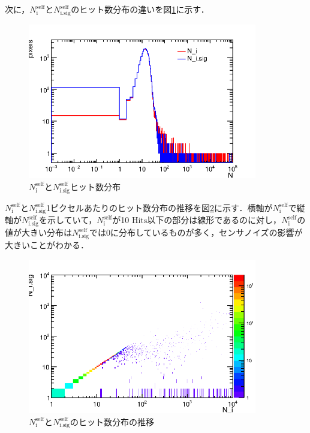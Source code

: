 次に，$N_{\mathrm{i}}^{\mathrm{self}}$と$N_{\mathrm{i.sig}}^{\mathrm{self}}$のヒット数分布の違いを図\ref{fig:selfhitperpix}に示す．
\begin{figure}[h]
  \centering
  \includegraphics[width=10cm]{./figure/selfhitperpix.png}
  \caption{$N_{\mathrm{i}}^{\mathrm{self}}$と$N_{\mathrm{i.sig}}^{\mathrm{self}}$ヒット数分布}
  \label{fig:selfhitperpix}
\end{figure}

$N_{\mathrm{i}}^{\mathrm{self}}$と$N_{\mathrm{i.sig}}^{\mathrm{self}}$1ピクセルあたりのヒット数分布の推移を図\ref{fig:selfhitperpixbfaf}に示す．横軸が$N_{\mathrm{i}}^{\mathrm{self}}$で縦軸が$N_{\mathrm{i.sig}}^{\mathrm{self}}$を示していて，$N_{\mathrm{i}}^{\mathrm{self}}$が10 $\mathrm{Hits}$以下の部分は線形であるのに対し，$N_{\mathrm{i}}^{\mathrm{self}}$の値が大きい分布は$N_{\mathrm{i.sig}}^{\mathrm{self}}$では0に分布しているものが多く，センサノイズの影響が大きいことがわかる．
\begin{figure}[h]
  \centering
  \includegraphics[width=10cm]{./figure/selfhitperpixbfaf.png}
  \caption{$N_{\mathrm{i}}^{\mathrm{self}}$と$N_{\mathrm{i.sig}}^{\mathrm{self}}$のヒット数分布の推移}
  \label{fig:selfhitperpixbfaf}
\end{figure}

